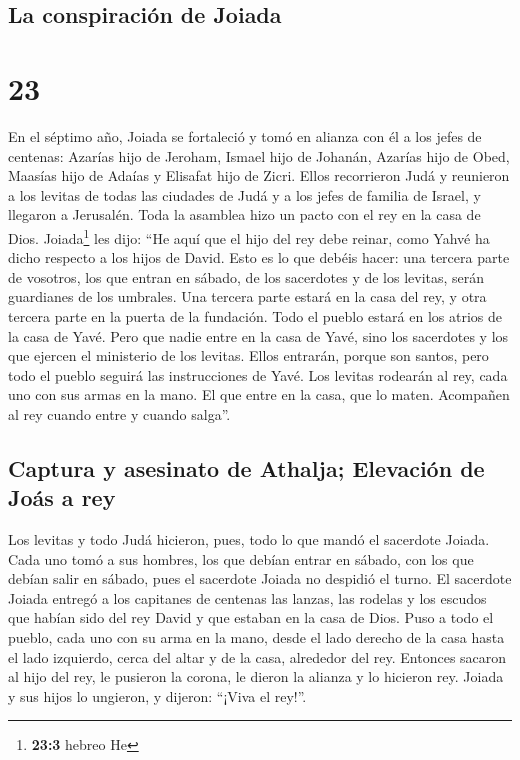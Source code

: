 \hypertarget{la-conspiraciuxf3n-de-joiada}{%
\subsection{La conspiración de
Joiada}\label{la-conspiraciuxf3n-de-joiada}}

\hypertarget{section-22}{%
\section{23}\label{section-22}}

 En el séptimo año, Joiada se fortaleció y tomó en alianza
con él a los jefes de centenas: Azarías hijo de Jeroham, Ismael hijo de
Johanán, Azarías hijo de Obed, Maasías hijo de Adaías y Elisafat hijo de
Zicri.  Ellos recorrieron Judá y reunieron a los levitas
de todas las ciudades de Judá y a los jefes de familia de Israel, y
llegaron a Jerusalén.  Toda la asamblea hizo un pacto con
el rey en la casa de Dios. Joiada\footnote{\textbf{23:3} hebreo He} les
dijo: ``He aquí que el hijo del rey debe reinar, como Yahvé ha dicho
respecto a los hijos de David.  Esto es lo que debéis
hacer: una tercera parte de vosotros, los que entran en sábado, de los
sacerdotes y de los levitas, serán guardianes de los umbrales.
 Una tercera parte estará en la casa del rey, y otra
tercera parte en la puerta de la fundación. Todo el pueblo estará en los
atrios de la casa de Yavé.  Pero que nadie entre en la
casa de Yavé, sino los sacerdotes y los que ejercen el ministerio de los
levitas. Ellos entrarán, porque son santos, pero todo el pueblo seguirá
las instrucciones de Yavé.  Los levitas rodearán al rey,
cada uno con sus armas en la mano. El que entre en la casa, que lo
maten. Acompañen al rey cuando entre y cuando salga''.

\hypertarget{captura-y-asesinato-de-athalja-elevaciuxf3n-de-jouxe1s-a-rey}{%
\subsection{Captura y asesinato de Athalja; Elevación de Joás a
rey}\label{captura-y-asesinato-de-athalja-elevaciuxf3n-de-jouxe1s-a-rey}}

 Los levitas y todo Judá hicieron, pues, todo lo que mandó
el sacerdote Joiada. Cada uno tomó a sus hombres, los que debían entrar
en sábado, con los que debían salir en sábado, pues el sacerdote Joiada
no despidió el turno.  El sacerdote Joiada entregó a los
capitanes de centenas las lanzas, las rodelas y los escudos que habían
sido del rey David y que estaban en la casa de Dios. 
Puso a todo el pueblo, cada uno con su arma en la mano, desde el lado
derecho de la casa hasta el lado izquierdo, cerca del altar y de la
casa, alrededor del rey.  Entonces sacaron al hijo del
rey, le pusieron la corona, le dieron la alianza y lo hicieron rey.
Joiada y sus hijos lo ungieron, y dijeron: ``¡Viva el rey!''.


